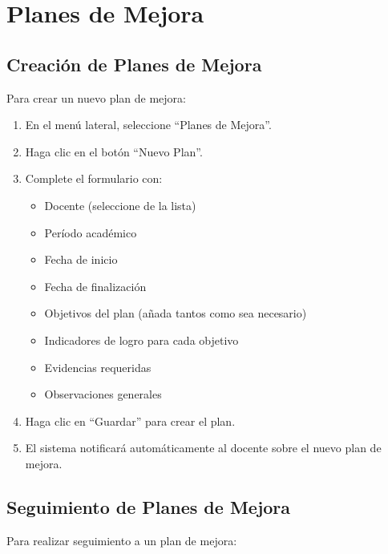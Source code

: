 \documentclass[12pt,a4paper]{book}
\begin{document}
\section{Planes de Mejora}
\subsection{Creación de Planes de Mejora}
Para crear un nuevo plan de mejora:

\begin{enumerate}
    \item En el menú lateral, seleccione ``Planes de Mejora''.
    \item Haga clic en el botón ``Nuevo Plan''.
    \item Complete el formulario con:
    \begin{itemize}
        \item Docente (seleccione de la lista)
        \item Período académico
        \item Fecha de inicio
        \item Fecha de finalización
        \item Objetivos del plan (añada tantos como sea necesario)
        \item Indicadores de logro para cada objetivo
        \item Evidencias requeridas
        \item Observaciones generales
    \end{itemize}
    \item Haga clic en ``Guardar'' para crear el plan.
    \item El sistema notificará automáticamente al docente sobre el nuevo plan de mejora.
\end{enumerate}

\subsection{Seguimiento de Planes de Mejora}
Para realizar seguimiento a un plan de mejora:
\end{document}
